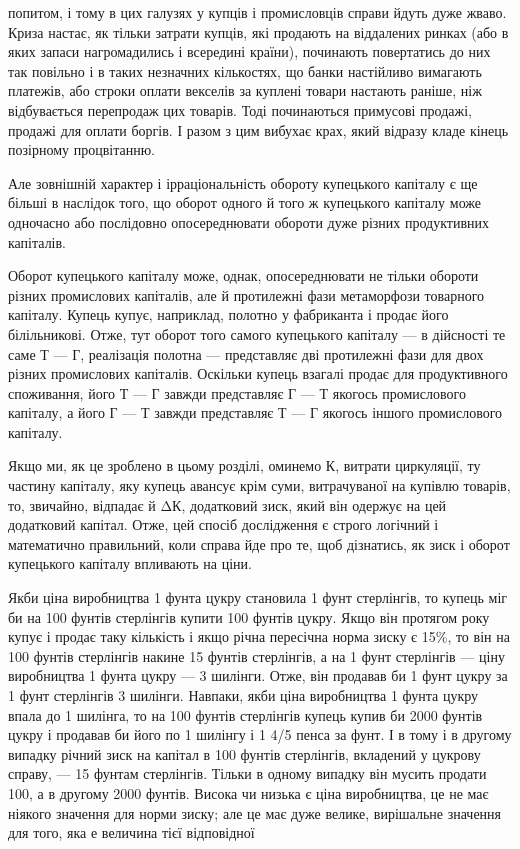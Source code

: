 попитом, і тому в цих галузях у купців і промисловців справи
йдуть дуже жваво. Криза настає, як тільки затрати купців, які
продають на віддалених ринках (або в яких запаси нагромадились
і всередині країни), починають повертатись до них так
повільно і в таких незначних кількостях, що банки настійливо
вимагають платежів, або строки оплати векселів за куплені
товари настають раніше, ніж відбувається перепродаж цих
товарів. Тоді починаються примусові продажі, продажі для
оплати боргів. І разом з цим вибухає крах, який відразу кладе
кінець позірному процвітанню.

Але зовнішній характер і ірраціональність обороту купецького
капіталу є ще більші в наслідок того, що оборот одного й того ж
купецького капіталу може одночасно або послідовно опосереднювати
обороти дуже різних продуктивних капіталів.

Оборот купецького капіталу може, однак, опосереднювати
не тільки обороти різних промислових капіталів, але й протилежні
фази метаморфози товарного капіталу. Купець купує,
наприклад, полотно у фабриканта і продає його білільникові.
Отже, тут оборот того самого купецького капіталу — в дійсності
те саме Т — Г, реалізація полотна — представляє дві протилежні
фази для двох різних промислових капіталів. Оскільки
купець взагалі продає для продуктивного споживання, його
Т — Г завжди представляє Г — Т якогось промислового капіталу,
а його Г — Т завжди представляє Т — Г якогось іншого промислового
капіталу.

Якщо ми, як це зроблено в цьому розділі, оминемо К, витрати
циркуляції, ту частину капіталу, яку купець авансує крім
суми, витрачуваної на купівлю товарів, то, звичайно, відпадає
й ΔК, додатковий зиск, який він одержує на цей додатковий
капітал. Отже, цей спосіб дослідження є строго логічний і математично
правильний, коли справа йде про те, щоб дізнатись,
як зиск і оборот купецького капіталу впливають на ціни.

Якби ціна виробництва 1 фунта цукру становила 1 фунт
стерлінгів, то купець міг би на 100 фунтів стерлінгів купити
100 фунтів цукру. Якщо він протягом року купує і продає таку
кількість і якщо річна пересічна норма зиску є 15\%, то він
на 100 фунтів стерлінгів накине 15 фунтів стерлінгів, а на
1 фунт стерлінгів — ціну виробництва 1 фунта цукру — 3 шилінги.
Отже, він продавав би 1 фунт цукру за 1 фунт стерлінгів 3 шилінги.
Навпаки, якби ціна виробництва 1 фунта цукру впала до
1 шилінга, то на 100 фунтів стерлінгів купець купив би 2000 фунтів
цукру і продавав би його по 1 шилінгу і 1 4/5 пенса за фунт.
І в тому і в другому випадку річний зиск на капітал в 100 фунтів
стерлінгів, вкладений у цукрову справу, — 15 фунтам стерлінгів.
Тільки в одному випадку він мусить продати 100, а в другому
2000 фунтів. Висока чи низька є ціна виробництва, це не має
ніякого значення для норми зиску; але це має дуже велике,
вирішальне значення для того, яка е величина тієї відповідної
